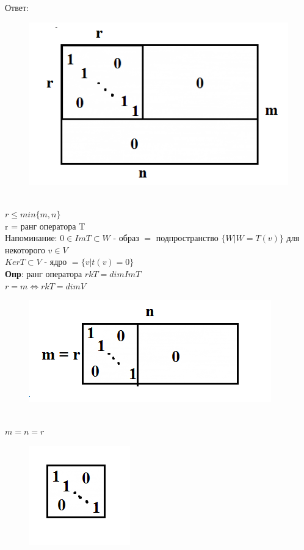 \documentclass[12pt, oneside]{book}
\theoremstyle{definition}
\renewcommand{\leq}{\leqslant}
\begin{document}
\begin{enumerate}
Ответ: \begin{figure}[h!]
\centering
\includegraphics[scale=0.6]{8-1.PNG}
\end{figure}\\
$r \leq  min \{m,n\}$\\
r = ранг оператора T\\
Напоминание: $0 \in Im T \subset W$ - образ $=$ подпространство $\{ W| W = T(v) \}$ для некоторого $v\in V$\\
$Ker T \subset V$ - ядро $= \{v| t(v) = 0\}$\\
\textbf{Опр}: ранг оператора $rk T = dim Im T$\\
$r = m \Longleftrightarrow rk T = dim V$\\
\begin{figure}[h!]
\centering
\includegraphics[scale=0.6]{8-2.PNG}
\end{figure}\\
$m = n = r$\\
\begin{figure}[h!]
\centering
\includegraphics[scale=0.6]{8-3.PNG}

\end{figure}
\end{enumerate}
\end{document}

